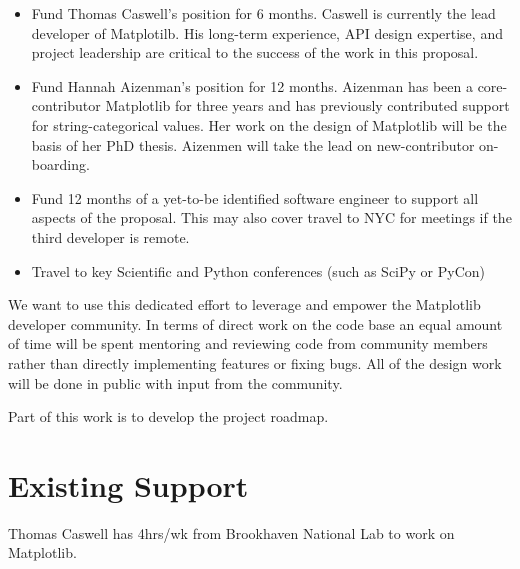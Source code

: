 \documentclass[11pt]{article}  %
\begin{document}
\begin{itemize}

\item Fund Thomas Caswell's position for 6 months.  Caswell is
  currently the lead developer of Matplotilb.  His long-term
  experience, API design expertise, and project leadership are critical
  to the success of the work in this proposal.
\item Fund Hannah Aizenman's position for 12 months.  Aizenman has
  been a core-contributor Matplotlib for three years and has
  previously contributed support for string-categorical values.  Her
  work on the design of Matplotlib will be the basis of her PhD
  thesis.  Aizenmen will take the lead on new-contributor on-boarding.
\item Fund 12 months of a yet-to-be identified software engineer to
  support all aspects of the proposal.  This may also cover travel to
  NYC for meetings if the third developer is remote.
\item Travel to key Scientific and Python conferences (such as SciPy
  or PyCon)
\end{itemize}

We want to use this dedicated effort to leverage and empower the
Matplotlib developer community.  In terms of direct work on the code
base an equal amount of time will be spent mentoring and reviewing
code from community members rather than directly implementing features
or fixing bugs.  All of the design work will be done in public with
input from the community.

Part of this work is to develop the project roadmap.


\section{Existing Support}

Thomas Caswell has 4hrs/wk from Brookhaven National Lab to work on Matplotlib.


\clearpage

\end{document}
